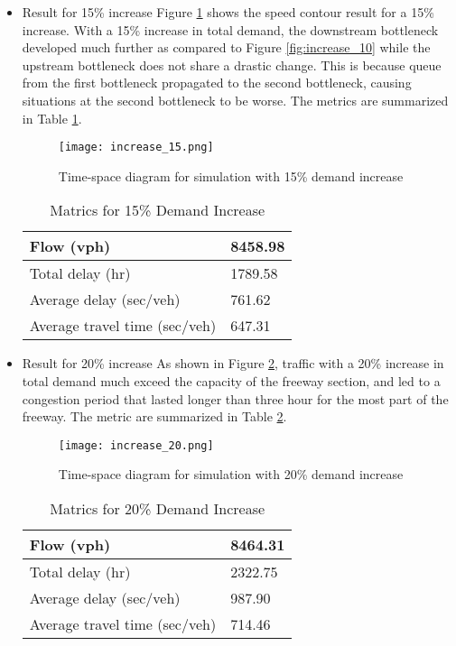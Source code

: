 \documentclass{article}
\begin{document}
\begin{itemize}
\item {Result for 15\% increase}
\newline
Figure \ref{fig:increase_15} shows the speed contour result for a 15\% increase. With a 15\% increase in total demand, the downstream bottleneck developed much further as compared to Figure \ref{fig:increase_10} while the upstream bottleneck does not share a drastic change. This is because queue from the first bottleneck propagated to the second bottleneck, causing situations at the second bottleneck to be worse. The metrics are summarized in Table \ref{15per}.
\begin{figure}
    \centering
    \texttt{[image: increase\_15.png]}
    \caption{Time-space diagram for simulation with 15\% demand increase}
    \label{fig:increase_15}
\end{figure}

\begin{table}[]
\centering
\caption{Matrics for 15\% Demand Increase}
\begin{tabular}{|l|l|}
\hline
Flow (vph)                    & 8458.98 \\ \hline
Total delay (hr)              & 1789.58 \\ \hline
Average delay (sec/veh)       & 761.62  \\ \hline
Average travel time (sec/veh) & 647.31  \\ \hline
\end{tabular}
\label{15per}
\end{table}

\item {Result for 20\% increase}
\newline
As shown in Figure \ref{fig:increase_20}, traffic with a 20\% increase in total demand much exceed the capacity of the freeway section, and led to a congestion period that lasted longer than three hour for the most part of the freeway. The metric are summarized in Table \ref{20per}.
\begin{figure}
    \centering
    \texttt{[image: increase\_20.png]}
    \caption{Time-space diagram for simulation with 20\% demand increase}
    \label{fig:increase_20}
\end{figure}

\begin{table}[]
\centering
\caption{Matrics for 20\% Demand Increase}
\begin{tabular}{|l|l|}
\hline
Flow (vph)                    & 8464.31 \\ \hline
Total delay (hr)              & 2322.75 \\ \hline
Average delay (sec/veh)       & 987.90  \\ \hline
Average travel time (sec/veh) & 714.46  \\ \hline
\end{tabular}
\label{20per}
\end{table}

\end{itemize}
\end{document}
